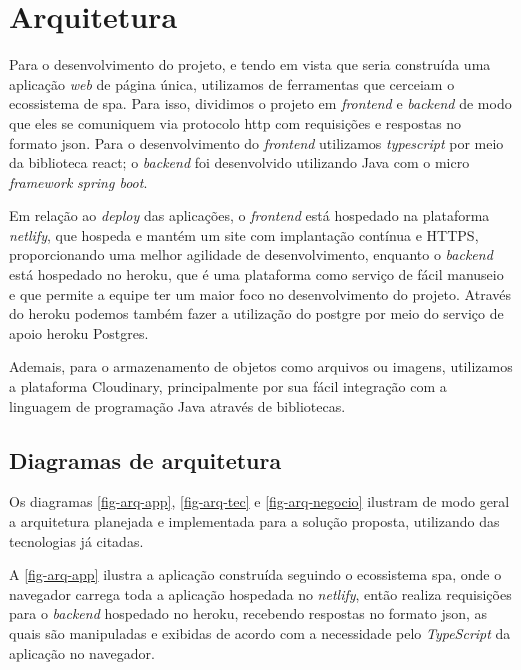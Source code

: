 \section{Arquitetura}
Para o desenvolvimento do projeto, e tendo em vista que seria construída uma aplicação \textit{web} de página única, utilizamos de ferramentas que cerceiam o ecossistema de \ac{spa}. Para isso, dividimos o projeto em \textit{\gls{frontend}} e \textit{\gls{backend}} de modo que eles se comuniquem via protocolo \ac{http} com requisições e respostas no formato \ac{json}. Para o desenvolvimento do \textit{\gls{frontend}} utilizamos \textit{\gls{typescript}} por meio da biblioteca \gls{react}; o \textit{\gls{backend}} foi desenvolvido utilizando Java com o micro \textit{\gls{framework}} \textit{\gls{spring boot}}.

Em relação ao \textit{\gls{deploy}} das aplicações, o \textit{\gls{frontend}} está hospedado na plataforma \textit{\gls{netlify}}, que hospeda e mantém um site com implantação contínua e HTTPS, proporcionando uma melhor agilidade de desenvolvimento, enquanto o \textit{\gls{backend}} está hospedado no \gls{heroku}, que é uma plataforma como serviço de fácil manuseio e que permite a equipe ter um maior foco no desenvolvimento do projeto. Através do \gls{heroku} podemos também fazer a utilização do \gls{postgre} por meio do serviço de apoio \gls{heroku} Postgres.

Ademais, para o armazenamento de objetos como arquivos ou imagens, utilizamos a plataforma Cloudinary, principalmente por sua fácil integração com a linguagem de programação Java através de bibliotecas.

\subsection{Diagramas de arquitetura}
Os diagramas \autoref{fig-arq-app}, \autoref{fig-arq-tec} e \autoref{fig-arq-negocio} ilustram de modo geral a arquitetura planejada e implementada para a solução proposta, utilizando das tecnologias já citadas.

A \autoref{fig-arq-app} ilustra a aplicação construída seguindo o ecossistema \ac{spa}, onde o navegador carrega toda a aplicação hospedada no \textit{\gls{netlify}}, então realiza requisições para o \textit{\gls{backend}} hospedado no \gls{heroku}, recebendo respostas no formato \ac{json}, as quais são manipuladas e exibidas de acordo com a necessidade pelo \textit{TypeScript} da aplicação no navegador.

